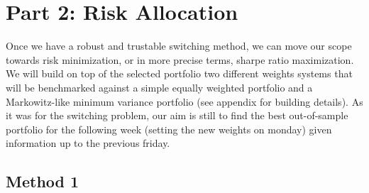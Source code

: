 \documentclass[a4paper]{article}
\numberwithin{equation}{subsection}
\begin{document}
\section*{Part 2: Risk Allocation}

Once we have a robust and trustable switching method, we can move our scope towards risk minimization, or in more precise terms, sharpe ratio maximization. We will build on top of the selected portfolio two different weights systems that will be benchmarked against a simple equally weighted portfolio and a Markowitz-like minimum variance portfolio (see appendix for building details). As it was for the switching problem, our aim is still to find the best out-of-sample portfolio for the following week (setting the new weights on monday) given information up to the previous friday. \\

\subsection*{Method 1}
\end{document}
